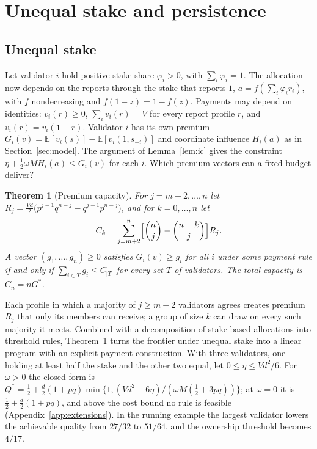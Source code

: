 \documentclass[sigconf,anonymous,review]{acmart}
\numberwithin{equation}{section}
\newtheorem{theorem}{Theorem}[section]
\newcommand{\E}{\mathbb{E}}
\newcommand{\Gs}{G^{*}}
\begin{document}
\section{Unequal stake and persistence}
\label{sec:extensions}

\subsection{Unequal stake}

Let validator $i$ hold positive stake share $\varphi_i>0$, with $\sum_i\varphi_i=1$. The
allocation now depends on the reports through the stake that reports $1$,
$a=f(\sum_i\varphi_ir_i)$, with $f$ nondecreasing and $f(1-z)=1-f(z)$. Payments
may depend on identities: $v_i(r)\ge0$, $\sum_iv_i(r)=V$ for every report
profile $r$, and $v_i(r)=v_i(\mathbf 1-r)$. Validator $i$ has its own premium
$G_i(v)=\E[v_i(s)]-\E[v_i(1,s_{-i})]$ and coordinate influence $H_i(a)$
as in Section~\ref{sec:model}. The argument of Lemma~\ref{lem:ic} gives the constraint
$\eta+\frac12\omega MH_i(a)\le G_i(v)$ for each $i$. Which premium vectors can
a fixed budget deliver?

\begin{theorem}[Premium capacity]\label{thm:capacity}
For $j=m+2,\dots,n$ let
$R_j=\frac{Vd}{2}\bigl(p^{j-1}q^{n-j}-q^{j-1}p^{n-j}\bigr)$, and for
$k=0,\dots,n$ let
\[
C_k=\sum_{j=m+2}^{n}\Bigl[\binom nj-\binom{n-k}{j}\Bigr]R_j .
\]
A vector $(g_1,\dots,g_n)\ge0$ satisfies $G_i(v)\ge g_i$ for all $i$ under
some payment rule if and only if $\sum_{i\in T}g_i\le C_{|T|}$ for every set
$T$ of validators. The total capacity is $C_n=n\Gs$.
\end{theorem}

Each profile in which a majority of $j\ge m+2$ validators agrees creates
premium $R_j$ that only its members can receive; a group of size $k$ can draw
on every such majority it meets. Combined with a decomposition of stake-based
allocations into threshold rules, Theorem~\ref{thm:capacity} turns the frontier
under unequal stake into a linear program with an explicit payment
construction. With three validators, one holding at least half the stake and
the other two equal, let $0\le\eta\le Vd^2/6$. For $\omega>0$ the closed form is
$Q^*=\frac12+\frac d2(1+pq)\min\{1,(Vd^2-6\eta)/(\omega M(\frac12+3pq))\}$;
at $\omega=0$ it is $\frac12+\frac d2(1+pq)$, and above the cost bound no rule
is feasible (Appendix~\ref{app:extensions}). In the running example the largest validator lowers the achievable quality from
$27/32$ to $51/64$, and the ownership threshold becomes $4/17$.
\end{document}
